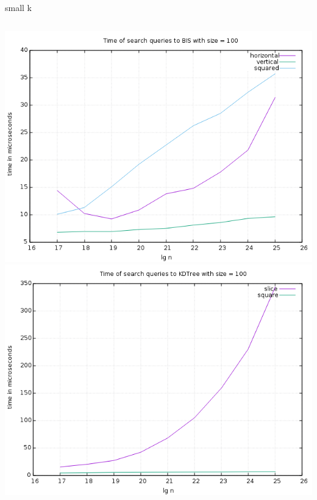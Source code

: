 \documentclass[pdf]{beamer}
\begin{document}
\begin{frame}{small k}
  \begin{columns}
    \includegraphics[scale=0.32]{pictures/analysis/smalls/all_100.png}
    \includegraphics[scale=0.32]{pictures/analysis/smalls/all_kdtree_100_2.png}
  \end{columns}
\end{frame}
\end{document}
